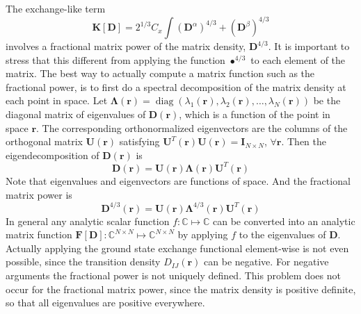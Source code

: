 \documentclass[journal=jacsat,manuscript=article]{achemso}
\DeclareMathOperator{\Diag}{diag}
\newcommand\m[1]{\mathbf{#1}}
\renewcommand\vec[1]{\mathbf{#1}}
\begin{document}
The exchange-like term
\begin{equation}
\m{K}[\m{D}] = 2^{1/3} C_x \int (\m{D}^{\alpha})^{4/3} + (\m{D}^{\beta})^{4/3} \label{eqn:exchange_term}
\end{equation}
involves a fractional matrix power of the matrix density, $\m{D}^{4/3}$.
It is important to stress that this different from applying the function $\bullet^{4/3}$ to
each element of the matrix. The best way to actually compute a matrix function such as the fractional power,
is to first do a spectral decomposition of the matrix density at each point in space. Let
$\m{\Lambda}(\vec{r}) = \Diag\left(\lambda_1(\vec{r}),\lambda_2(\vec{r}),\ldots,\lambda_N(\vec{r}) \right)$ be the diagonal
matrix of eigenvalues of $\m{D}(\vec{r})$, which is a function of the point in space $\vec{r}$. The corresponding orthonormalized
eigenvectors are the columns of the orthogonal matrix $\m{U}(\vec{r})$ satisfying $\m{U}^T(\vec{r}) \m{U}(\vec{r}) = \m{I}_{N \times N}$, $\forall \vec{r}$.
Then the eigendecomposition of $\m{D}(\vec{r})$ is
\begin{equation}
 \m{D}(\vec{r}) = \m{U}(\vec{r}) \m{\Lambda}(\vec{r}) \m{U}^T(\vec{r})
\end{equation}
Note that eigenvalues and eigenvectors are functions of space. And the fractional matrix power is 
\begin{equation}
  \m{D}^{4/3}(\vec{r}) = \m{U}(\vec{r}) \m{\Lambda}^{4/3}(\vec{r}) \m{U}^T(\vec{r})  
\end{equation}
In general any analytic scalar function $f : \mathbb{C} \mapsto \mathbb{C}$ can be converted into an analytic
matrix function $\m{F}[\m{D}]: \mathbb{C}^{N \times N} \mapsto \mathbb{C}^{N \times N}$ by applying $f$ to
the eigenvalues of $\m{D}$. 
Actually applying the ground state exchange functional element-wise is not even possible, since the transition density $D_{IJ}(\vec{r})$
can be negative. For negative arguments the fractional power is not uniquely defined. This problem does not occur for the fractional matrix
power, since the matrix density is positive definite, so that all eigenvalues are positive everywhere.
\end{document}
